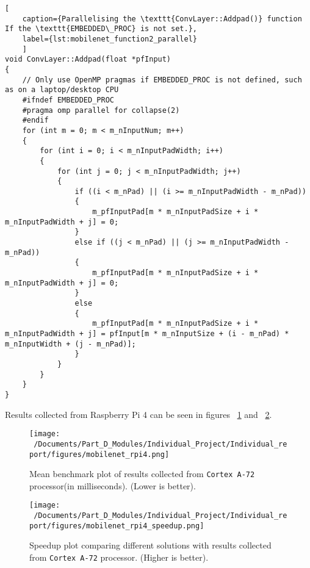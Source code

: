 \begin{lstlisting}[
	caption={Parallelising the \texttt{ConvLayer::Addpad()} function If the \texttt{EMBEDDED\_PROC} is not set.},
	label={lst:mobilenet_function2_parallel}
	]
void ConvLayer::Addpad(float *pfInput)
{
	// Only use OpenMP pragmas if EMBEDDED_PROC is not defined, such as on a laptop/desktop CPU 
	#ifndef EMBEDDED_PROC
	#pragma omp parallel for collapse(2)
	#endif
	for (int m = 0; m < m_nInputNum; m++)
	{
		for (int i = 0; i < m_nInputPadWidth; i++)
		{
			for (int j = 0; j < m_nInputPadWidth; j++)
			{
				if ((i < m_nPad) || (i >= m_nInputPadWidth - m_nPad))
				{
					m_pfInputPad[m * m_nInputPadSize + i * m_nInputPadWidth + j] = 0;
				}
				else if ((j < m_nPad) || (j >= m_nInputPadWidth - m_nPad))
				{
					m_pfInputPad[m * m_nInputPadSize + i * m_nInputPadWidth + j] = 0;
				}
				else
				{
					m_pfInputPad[m * m_nInputPadSize + i * m_nInputPadWidth + j] = pfInput[m * m_nInputSize + (i - m_nPad) * m_nInputWidth + (j - m_nPad)];
				}
			}
		}
	}
}
\end{lstlisting}


Results collected from Raspberry Pi 4 can be seen in figures ~\ref{fig:mobilenet_rpi4_plot} and ~\ref{fig:mobilenet_rpi4_speedup}. 

\begin{figure}[H] %
	\centering
	\texttt{[image: ~/Documents/Part\_D\_Modules/Individual\_Project/Individual\_report/figures/mobilenet\_rpi4.png]} %
	\caption{Mean benchmark plot of results collected from \texttt{Cortex A-72} processor(in milliseconds). (Lower is better).}
	\label{fig:mobilenet_rpi4_plot} %
\end{figure}

\begin{figure}[H] %
	\centering
	\texttt{[image: ~/Documents/Part\_D\_Modules/Individual\_Project/Individual\_report/figures/mobilenet\_rpi4\_speedup.png]} %
	\caption{Speedup plot comparing different solutions with results collected from \texttt{Cortex A-72} processor. (Higher is better).}
	\label{fig:mobilenet_rpi4_speedup} %
\end{figure}

